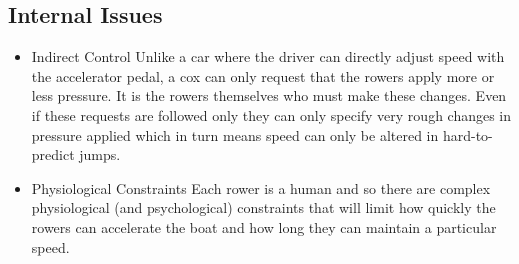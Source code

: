 \subsection{Internal Issues}
\begin{itemize}
  \item{Indirect Control} Unlike a car where the driver can directly adjust speed with the accelerator pedal, a cox can only request that the rowers apply more or less pressure. It is the rowers themselves who must make these changes. Even if these requests are followed only they can only specify very rough changes in pressure applied which in turn means speed can only be altered in hard-to-predict jumps.
  
  \item{Physiological Constraints} Each rower is a human and so there are complex physiological (and psychological) constraints that will limit how quickly the rowers can accelerate the boat and how long they can maintain a particular speed.
\end{itemize}

